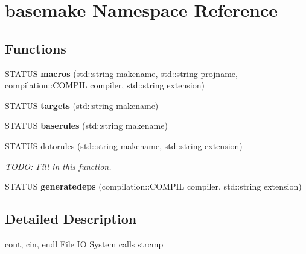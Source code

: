 \hypertarget{namespacebasemake}{}\section{basemake Namespace Reference}
\label{namespacebasemake}
\subsection*{Functions}
\begin{DoxyCompactItemize}
\item 
\mbox{\label{namespacebasemake_a5b3fc9a6d9d0bf25d2e827529b160031}} 
S\+T\+A\+T\+US {\bfseries macros} (std\+::string makename, std\+::string projname, compilation\+::\+C\+O\+M\+P\+IL compiler, std\+::string extension)
\item 
\mbox{\label{namespacebasemake_a6731aef50bd4fe975aeed98a4e9373d4}} 
S\+T\+A\+T\+US {\bfseries targets} (std\+::string makename)
\item 
\mbox{\label{namespacebasemake_a7fc24e7fc7f5c6fcc0f4454c1b6ef9ef}} 
S\+T\+A\+T\+US {\bfseries baserules} (std\+::string makename)
\item 
\mbox{\label{namespacebasemake_a63c4ae79b21dd71b111589322b888167}} 
S\+T\+A\+T\+US \mbox{\hyperlink{namespacebasemake_a63c4ae79b21dd71b111589322b888167}{dotorules}} (std\+::string makename, std\+::string extension)
\begin{DoxyCompactList}\small\item\em T\+O\+DO\+: Fill in this function. \end{DoxyCompactList}\item 
\mbox{\label{namespacebasemake_a0dfd9121ee780c0faaf7eb9ac4c58d63}} 
S\+T\+A\+T\+US {\bfseries generatedeps} (compilation\+::\+C\+O\+M\+P\+IL compiler, std\+::string extension)
\end{DoxyCompactItemize}


\subsection{Detailed Description}
cout, cin, endl File IO System calls strcmp 